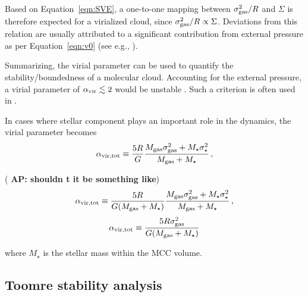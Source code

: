 \IfFileExists{emulateapjlegacy.cls}{\documentclass[iop]{emulateapjlegacy}}{\documentclass[iop]{emulateapj}}
\newcommand{\AP}[1]{({\bf \color{apcolor} AP: #1})}
\begin{document}
Based on Equation~\ref{eqn:SVE}, a one-to-one mapping between $\sigma_{\rm gas}^2/R$ and $\Sigma$ is therefore expected for a virialized cloud, since $\sigma_{\rm gas}^2/R\propto\Sigma$. Deviations from this relation are usually attributed to a significant contribution from external pressure as per Equation~\ref{eqn:v0} (see e.g., \citealt{Heyer09a, Hughes10a, Hughes13b, Meidt13a}).

Summarizing, the virial parameter can be used to quantify the stability/boundedness of
    a molecular cloud.
Accounting for the external pressure, a virial parameter of $\alpha_{\rm vir}\lesssim2$ would be unstable \citep{bertoldi:1992}.
%
Such a criterion is often used in \obs \citep[see e.g., ][]{Kauffmann17b}.

In cases where stellar component plays an important role in the dynamics, the virial parameter becomes
\begin{equation}
\alpha_{\rm vir, tot} \equiv \frac{5 R}{G} \frac{M_{\rm gas} \sigma_{\rm gas}^2 + M_{\star} \sigma_\star^2}
					       {M_{\rm gas} + M_{\star} }\,,
\label{eqn:alpha_tot}
\end{equation}

\AP{shouldn t it be something like}
\begin{equation}
\alpha_{\rm vir, tot} \equiv \frac{5 R}{G (M_{\rm gas} + M_{\star})} \frac{M_{\rm gas} \sigma_{\rm gas}^2 + M_{\star} \sigma_\star^2}
					       {M_{\rm gas} + M_{\star} }\,,
\label{eqn:alpha_tot}
\end{equation}
\begin{equation}
\alpha_{\rm vir, tot} \equiv \frac{5 R \sigma_{\rm gas}^2}{G (M_{\rm gas} + M_{\star})}
\label{eqn:alpha_tot}
\end{equation}

where $M_\star$ is the stellar mass within the MCC volume.


\subsection{Toomre stability analysis}\label{sec:Q}
\end{document}
